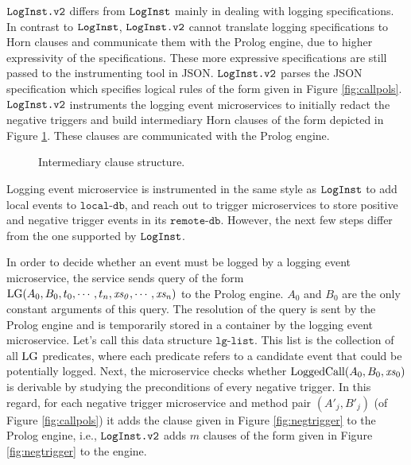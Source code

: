 $\texttt{LogInst.v2}$ differs from $\texttt{LogInst}$ mainly in dealing with logging specifications. In contrast to $\texttt{LogInst}$, $\texttt{LogInst.v2}$ cannot translate logging specifications to Horn clauses and communicate them with the Prolog engine, due to higher expressivity of the specifications. These more expressive specifications are still passed to the instrumenting tool in JSON. $\texttt{LogInst.v2}$ parses the JSON specification which specifies logical rules of the form given in Figure \ref{fig:callpols}. $\texttt{LogInst.v2}$ instruments the logging event microservices to initially redact the negative triggers and build intermediary Horn clauses of the form depicted in Figure \ref{fig:intermediary}. These clauses are communicated with the Prolog engine. 


\begin{figure}
\setlength{\fboxsep}{0pt}%
\caption{Intermediary clause structure.} 
\label{fig:intermediary}
\end{figure}

Logging event microservice is instrumented in the same style as $\texttt{LogInst}$ to add local events to $\texttt{local-db}$, and reach out to trigger microservices to store positive and negative trigger events in its $\texttt{remote-db}$. However, the next few steps differ from the one supported by $\texttt{LogInst}$.

In order to decide whether an event must be logged by a logging event microservice, the service sends query of the form $\mathrm{LG}(A_0, B_0, t_0, \cdots, t_n,\mathit{xs_0}, \cdots, \mathit{xs_n})$ to the Prolog engine. $A_0$ and $B_0$ are the only constant arguments of this query. The resolution of the query is sent by the Prolog engine and is temporarily stored in a container by the logging event microservice. Let's call this data structure $\texttt{lg-list}$. This list is the collection of all $\mathrm{LG}$ predicates, where each predicate refers to a candidate event that could be potentially logged.  %
Next, the microservice checks whether $\mathrm{LoggedCall}(A_0, B_0, \mathit{xs}_0)$ is derivable by studying the preconditions of every negative trigger. In this regard, for each negative trigger microservice and method pair $(A'_j, B'_j)$ (of Figure \ref{fig:callpols}) it adds the clause given in Figure \ref{fig:negtrigger} to the Prolog engine, i.e., $\texttt{LogInst.v2}$ adds $m$ clauses of the form given in Figure \ref{fig:negtrigger} to the engine. 

